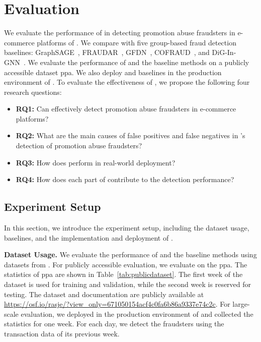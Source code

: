 \section{Evaluation}\label{sec:evaluation}
We evaluate the performance of \toolname in detecting promotion abuse fraudsters in e-commerce platforms of \Company. We compare \toolname with five group-based fraud detection baselines: GraphSAGE~\cite{10.5555/3294771.3294869}, FRAUDAR~\cite{hooi2016fraudar}, GFDN~\cite{yu2023group}, COFRAUD~\cite{zang2023don}, and DiG-In-GNN~\cite{zhang2024dig}. We evaluate the performance of \toolname and the baseline methods on a publicly accessible dataset \ac{ppa}. We also deploy \toolname and baselines in the production environment of \Company. To evaluate the effectiveness of \toolname, we propose the following four research questions:

\begin{itemize}[noitemsep, topsep=1pt, partopsep=1pt, listparindent=\parindent, leftmargin=*]
    \item \textbf{RQ1:} Can \toolname effectively detect promotion abuse fraudsters in e-commerce platforms?
    \item \textbf{RQ2:} What are the main causes of false positives and false negatives in \toolname's detection of promotion abuse fraudsters?  
    \item \textbf{RQ3:} How does \toolname perform in real-world deployment?
    \item \textbf{RQ4:} How does each part of \toolname contribute to the detection performance?
\end{itemize}


\subsection{Experiment Setup}
In this section, we introduce the experiment setup, including the dataset usage, baselines, and the implementation and deployment of \toolname.


\noindent \textbf{Dataset Usage.} 
We evaluate the performance of \toolname and the baseline methods using datasets from \Company. For publicly accessible evaluation, we evaluate on the \ac{ppa}. The statistics of \ac{ppa} are shown in Table~\ref{tab:publicdataset}. The first week of the dataset is used for training and validation, while the second week is reserved for testing. The dataset and documentation are publicly available at \url{https://osf.io/rasje/?view_only=671050154acf4c0fa6b86a9337e74c2c}.
For large-scale evaluation, we deployed \toolname in the production environment of \Company and collected the statistics for one week. For each day, we detect the fraudsters using the transaction data of its previous week. 


